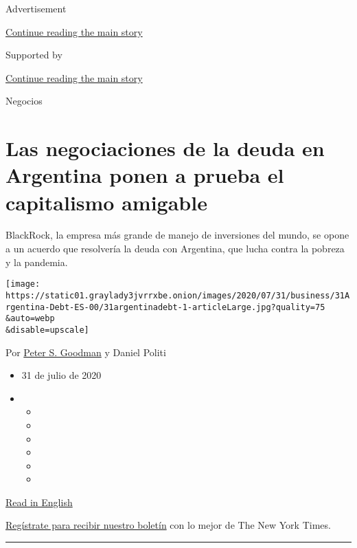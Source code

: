 Advertisement

\protect\hyperlink{after-top}{Continue reading the main story}

Supported by

\protect\hyperlink{after-sponsor}{Continue reading the main story}

Negocios

\hypertarget{las-negociaciones-de-la-deuda-en-argentina-ponen-a-prueba-el-capitalismo-amigable}{%
\section{Las negociaciones de la deuda en Argentina ponen a prueba el
capitalismo
amigable}\label{las-negociaciones-de-la-deuda-en-argentina-ponen-a-prueba-el-capitalismo-amigable}}

BlackRock, la empresa más grande de manejo de inversiones del mundo, se
opone a un acuerdo que resolvería la deuda con Argentina, que lucha
contra la pobreza y la pandemia.

\texttt{[image: https://static01.graylady3jvrrxbe.onion/images/2020/07/31/business/31Argentina-Debt-ES-00/31argentinadebt-1-articleLarge.jpg?quality=75\\\&auto=webp\\\&disable=upscale]}

Por \href{https://www.nytimes3xbfgragh.onion/by/peter-s-goodman}{Peter
S. Goodman} y Daniel Politi

\begin{itemize}
\item
  31 de julio de 2020
\item
  \begin{itemize}
  \item
  \item
  \item
  \item
  \item
  \item
  \end{itemize}
\end{itemize}

\href{https://www.nytimes3xbfgragh.onion/2020/07/31/business/argentina-debt.html}{Read
in English}

\href{https://www.nytimes3xbfgragh.onion/newsletters/el-times}{Regístrate
para recibir nuestro boletín} con lo mejor de The New York Times.

\begin{center}\rule{0.5\linewidth}{\linethickness}\end{center}

